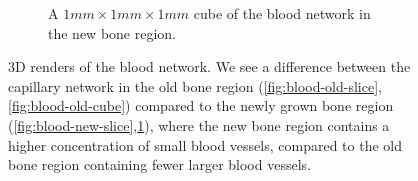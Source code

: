 \begin{figure}
\begin{subfigure}[b]{.48\linewidth}
        \caption{A $1mm \times 1 mm \times 1 mm$ cube of the blood network in the new bone region.}
        \label{fig:blood-new-cube}
    \end{subfigure}
    \caption{
        3D renders of the blood network. We see a difference between the
        capillary network in the old bone region
        (\ref{fig:blood-old-slice},\ref{fig:blood-old-cube}) compared to the
        newly grown bone region
        (\ref{fig:blood-new-slice},\ref{fig:blood-new-cube}), where the new
        bone region contains a higher concentration of small blood vessels,
        compared to the old bone region containing fewer larger blood vessels.
    }
    \label{fig:blood-network}
\end{figure}